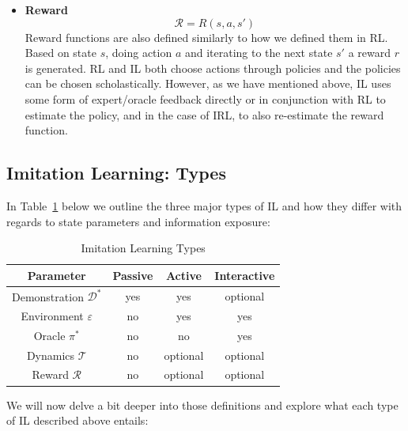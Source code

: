 \documentclass[11pt]{article}
\begin{document}
\begin{itemize}
    \item \textbf{Reward}
    \begin{equation}
        \mathcal{R} = R(s,a,s')
    \end{equation}
    Reward functions are also defined similarly to how we defined them in RL. Based on state $s$, doing action $a$ and iterating to the next state $s'$ a reward $r$ is generated. RL and IL both choose actions through policies and the policies can be chosen scholastically. However, as we have mentioned above, IL uses some form of expert/oracle feedback directly or in conjunction with RL to estimate the policy, and in the case of IRL, to also re-estimate the reward function.

\end{itemize}

\subsection{Imitation Learning: Types}

In Table~\ref{tab:type} below we outline the three major types of IL and how they differ with regards to state parameters and information exposure: 

\begin{table}[h]
\centering
\begin{tabular}{|c|c|c|c|}
\hline
\textbf{Parameter} & \textbf{Passive} & \textbf{Active} & \textbf{Interactive} \\ \hline
Demonstration $\mathcal{D}^*$     & yes        & yes       & optional       \\ \hline
Environment $\varepsilon$ & no         & yes       & yes            \\ \hline
Oracle $\pi^*$           & no         & no        & yes            \\ \hline
Dynamics $\mathcal{T}$             & no         & optional  & optional       \\ \hline
Reward $\mathcal{R}$               & no         & optional  & optional       \\ \hline



\end{tabular}
\caption{Imitation Learning Types}
\label{tab:type}
\end{table}

We will now delve a bit deeper into those definitions and explore what each type of IL described above entails:
\end{document}
